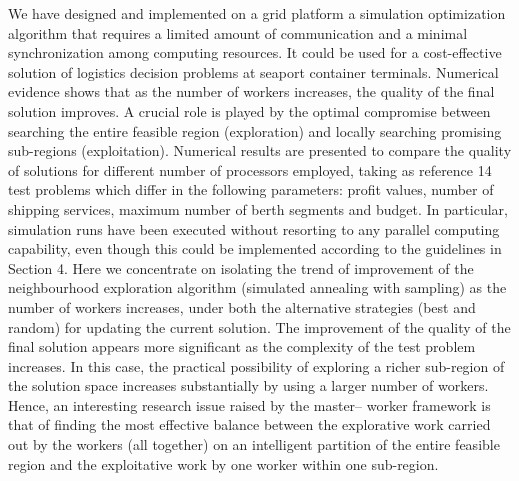 
We have designed and implemented on a grid platform a simulation optimization algorithm that requires a limited amount of communication and a minimal synchronization among computing resources. It could be used for a cost-effective solution of logistics decision problems at seaport container terminals. Numerical evidence shows that as the number of workers increases, the quality of the final solution improves. A crucial role is played by the optimal compromise between searching the entire feasible region (exploration) and locally searching promising sub-regions (exploitation).
Numerical results are presented to compare the quality of solutions for different number of processors
employed, taking as reference 14 test problems which differ in the following parameters: profit values, number
of shipping services, maximum number of berth segments and budget. In particular, simulation runs have been
executed without resorting to any parallel computing capability, even though this could be implemented
according to the guidelines in Section 4. Here we concentrate on isolating the trend of improvement of the
neighbourhood exploration algorithm (simulated annealing with sampling) as the number of workers
increases, under both the alternative strategies (best and random) for updating the current solution. The
improvement of the quality of the final solution appears more significant as the complexity of the test problem
increases. In this case, the practical possibility of exploring a richer sub-region of the solution space increases
substantially by using a larger number of workers. Hence, an interesting research issue raised by the master–
worker framework is that of finding the most effective balance between the explorative work carried out by
the workers (all together) on an intelligent partition of the entire feasible region and the exploitative work
by one worker within one sub-region.
